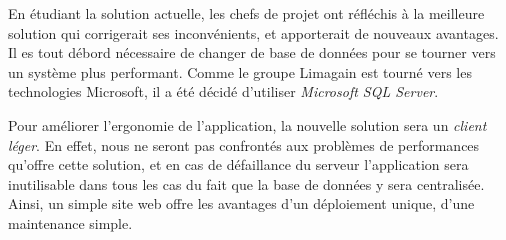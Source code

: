 En étudiant la solution actuelle, les chefs de projet ont réfléchis à la meilleure solution qui corrigerait ses inconvénients, et apporterait de nouveaux avantages.
\\


Il es tout débord nécessaire de changer de base de données pour se tourner vers un système plus performant. Comme le groupe Limagain est tourné vers les technologies Microsoft, il a été décidé d'utiliser \textit{Microsoft SQL Server}.

Pour améliorer l'ergonomie de l'application, la nouvelle solution sera un \textit{client léger}. En effet, nous ne seront pas confrontés aux problèmes de performances qu'offre cette solution, et en cas de défaillance du serveur l'application sera inutilisable dans tous les cas du fait que la base de données y sera centralisée. Ainsi, un simple site web offre les avantages d'un déploiement unique, d'une maintenance simple.